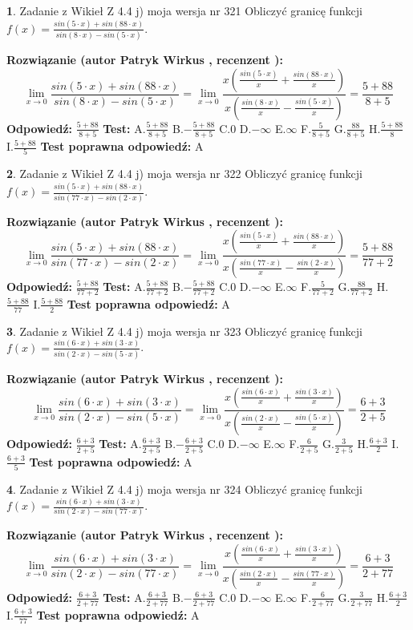 \documentclass[12pt, a4paper]{article}
\theoremstyle{definition} %
\newtheorem{zad}{}
\newcommand{\zadStart}[1]{\begin{zad}#1\newline}
\newcommand{\zadStop}{\end{zad}}
\newcommand{\rozwStart}[2]{\noindent \textbf{Rozwiązanie (autor #1 , recenzent #2): }\newline}
\newcommand{\rozwStop}{\newline}
\newcommand{\odpStart}{\noindent \textbf{Odpowiedź:}\newline}
\newcommand{\odpStop}{\newline}
\newcommand{\testStart}{\noindent \textbf{Test:}\newline}
\newcommand{\testStop}{\newline}
\newcommand{\kluczStart}{\noindent \textbf{Test poprawna odpowiedź:}\newline}
\newcommand{\kluczStop}{\newline}
\begin{document}
\zadStart{Zadanie z Wikieł Z 4.4 j) moja wersja nr 321}
Obliczyć granicę funkcji $f(x)=\frac{sin(5\cdot x) +sin(88\cdot x)}{sin(8\cdot x) -sin(5\cdot x)}$.
\zadStop
\rozwStart{Patryk Wirkus}{}
$$\lim\limits_{x\to 0}\frac{sin(5\cdot x) +sin(88\cdot x)}{sin(8\cdot x) -sin(5\cdot x)}=\lim\limits_{x\to 0}\frac{x(\frac{sin(5\cdot x)}{x}+\frac{sin(88\cdot x)}{x})}{x(\frac{sin(8\cdot x)}{x}-\frac{sin(5\cdot x)}{x})}=\frac{5+88}{8+5}$$
\rozwStop
\odpStart
$\frac{5+88}{8+5}$
\odpStop
\testStart
A.$\frac{5+88}{8+5}$
B.$-\frac{5+88}{8+5}$
C.$0$
D.$-\infty$
E.$\infty$
F.$\frac{5}{8+5}$
G.$\frac{88}{8+5}$
H.$\frac{5+88}{8}$
I.$\frac{5+88}{5}$
\testStop
\kluczStart
A
\kluczStop



\zadStart{Zadanie z Wikieł Z 4.4 j) moja wersja nr 322}
Obliczyć granicę funkcji $f(x)=\frac{sin(5\cdot x) +sin(88\cdot x)}{sin(77\cdot x) -sin(2\cdot x)}$.
\zadStop
\rozwStart{Patryk Wirkus}{}
$$\lim\limits_{x\to 0}\frac{sin(5\cdot x) +sin(88\cdot x)}{sin(77\cdot x) -sin(2\cdot x)}=\lim\limits_{x\to 0}\frac{x(\frac{sin(5\cdot x)}{x}+\frac{sin(88\cdot x)}{x})}{x(\frac{sin(77\cdot x)}{x}-\frac{sin(2\cdot x)}{x})}=\frac{5+88}{77+2}$$
\rozwStop
\odpStart
$\frac{5+88}{77+2}$
\odpStop
\testStart
A.$\frac{5+88}{77+2}$
B.$-\frac{5+88}{77+2}$
C.$0$
D.$-\infty$
E.$\infty$
F.$\frac{5}{77+2}$
G.$\frac{88}{77+2}$
H.$\frac{5+88}{77}$
I.$\frac{5+88}{2}$
\testStop
\kluczStart
A
\kluczStop



\zadStart{Zadanie z Wikieł Z 4.4 j) moja wersja nr 323}
Obliczyć granicę funkcji $f(x)=\frac{sin(6\cdot x) +sin(3\cdot x)}{sin(2\cdot x) -sin(5\cdot x)}$.
\zadStop
\rozwStart{Patryk Wirkus}{}
$$\lim\limits_{x\to 0}\frac{sin(6\cdot x) +sin(3\cdot x)}{sin(2\cdot x) -sin(5\cdot x)}=\lim\limits_{x\to 0}\frac{x(\frac{sin(6\cdot x)}{x}+\frac{sin(3\cdot x)}{x})}{x(\frac{sin(2\cdot x)}{x}-\frac{sin(5\cdot x)}{x})}=\frac{6+3}{2+5}$$
\rozwStop
\odpStart
$\frac{6+3}{2+5}$
\odpStop
\testStart
A.$\frac{6+3}{2+5}$
B.$-\frac{6+3}{2+5}$
C.$0$
D.$-\infty$
E.$\infty$
F.$\frac{6}{2+5}$
G.$\frac{3}{2+5}$
H.$\frac{6+3}{2}$
I.$\frac{6+3}{5}$
\testStop
\kluczStart
A
\kluczStop



\zadStart{Zadanie z Wikieł Z 4.4 j) moja wersja nr 324}
Obliczyć granicę funkcji $f(x)=\frac{sin(6\cdot x) +sin(3\cdot x)}{sin(2\cdot x) -sin(77\cdot x)}$.
\zadStop
\rozwStart{Patryk Wirkus}{}
$$\lim\limits_{x\to 0}\frac{sin(6\cdot x) +sin(3\cdot x)}{sin(2\cdot x) -sin(77\cdot x)}=\lim\limits_{x\to 0}\frac{x(\frac{sin(6\cdot x)}{x}+\frac{sin(3\cdot x)}{x})}{x(\frac{sin(2\cdot x)}{x}-\frac{sin(77\cdot x)}{x})}=\frac{6+3}{2+77}$$
\rozwStop
\odpStart
$\frac{6+3}{2+77}$
\odpStop
\testStart
A.$\frac{6+3}{2+77}$
B.$-\frac{6+3}{2+77}$
C.$0$
D.$-\infty$
E.$\infty$
F.$\frac{6}{2+77}$
G.$\frac{3}{2+77}$
H.$\frac{6+3}{2}$
I.$\frac{6+3}{77}$
\testStop
\kluczStart
A
\kluczStop
\end{document}

